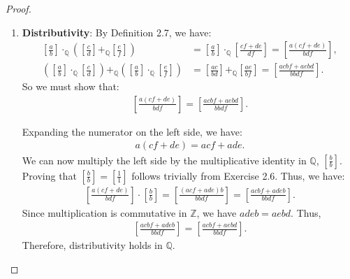 \documentclass[11pt]{article}
\begin{document}
\begin{proof}
\begin{enumerate}[label=(\alph*)]
    \begin{align*}
    \left[\frac{a \cdot b}{b \cdot a}\right] = \left[\frac{a \cdot b}{a \cdot b}\right].
    \end{align*}
    Now we must show that $\left[\frac{a \cdot b}{a \cdot b}\right] = \left[\frac{1}{1}\right]$.
    By Exercise 2.6, it suffices to show that:
    \begin{align*}
    (a \cdot b) \cdot 1 = 1 \cdot (a \cdot b).
    \end{align*}
    Since both sides are equal, we have:
    \begin{align*}
    \left[\frac{a \cdot b}{a \cdot b}\right] = \left[\frac{1}{1}\right].
    \end{align*}
    Therefore, $\left[\frac{b}{a}\right]$ is the multiplicative inverse of $\left[\frac{a}{b}\right]$ in $\mathbb{Q}$.
    \item \textbf{Distributivity}:  
    By Definition 2.7, we have:
    \begin{align*}
    \left[\frac{a}{b}\right]\cdot_{\mathbb{Q}} \left(\left[\frac{c}{d}\right]+_{\mathbb{Q}}\left[\frac{e}{f}\right]\right) 
    &= \left[\frac{a}{b}\right] \cdot_{\mathbb{Q}} \left[\frac{cf + de}{df}\right] 
    = \left[\frac{a(cf + de)}{bdf}\right],
    \\
    \left(\left[\frac{a}{b}\right]\cdot_{\mathbb{Q}} \left[\frac{c}{d}\right]\right) +_{\mathbb{Q}} \left( \left[\frac{a}{b}\right]\cdot_{\mathbb{Q}} \left[\frac{e}{f}\right]\right) 
    &= \left[\frac{ac}{bd}\right] +_{\mathbb{Q}} \left[\frac{ae}{bf}\right] 
    = \left[\frac{acbf + aebd}{bbdf}\right].
    \end{align*}
    So we must show that:
    \begin{align*}
    \left[\frac{a(cf + de)}{bdf}\right] = \left[\frac{acbf + aebd}{bbdf}\right].
    \end{align*}
  
    Expanding the numerator on the left side, we have:
    \begin{align*}
    a(cf + de) = acf + ade.
    \end{align*}
    We can now multiply the left side by the multiplicative identity in $\mathbb{Q}$, $\left[\frac{b}{b}\right]$. Proving that $\left[\frac{b}{b}\right] = \left[\frac{1}{1}\right]$ follows trivially from Exercise 2.6. Thus, we have:
    \begin{align*}
    \left[\frac{a(cf + de)}{bdf}\right] \cdot \left[\frac{b}{b}\right] = \left[\frac{(acf + ade)b}{bbdf}\right] = \left[\frac{acbf + adeb}{bbdf}\right].
    \end{align*}
    Since multiplication is commutative in $\mathbb{Z}$, we have $adeb = aebd$. Thus,
    \begin{align*}
    \left[\frac{acbf + adeb}{bbdf}\right] = \left[\frac{acbf + aebd}{bbdf}\right].
    \end{align*}
    Therefore, distributivity holds in $\mathbb{Q}$.
\end{enumerate}
\end{proof}
\end{document}
